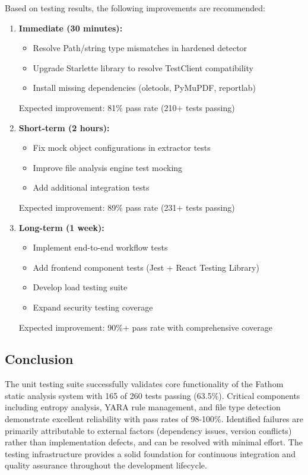 Based on testing results, the following improvements are recommended:

\begin{enumerate}
    \item \textbf{Immediate (30 minutes):}
    \begin{itemize}
        \item Resolve Path/string type mismatches in hardened detector
        \item Upgrade Starlette library to resolve TestClient compatibility
        \item Install missing dependencies (oletools, PyMuPDF, reportlab)
    \end{itemize}
    Expected improvement: 81\% pass rate (210+ tests passing)
    
    \item \textbf{Short-term (2 hours):}
    \begin{itemize}
        \item Fix mock object configurations in extractor tests
        \item Improve file analysis engine test mocking
        \item Add additional integration tests
    \end{itemize}
    Expected improvement: 89\% pass rate (231+ tests passing)
    
    \item \textbf{Long-term (1 week):}
    \begin{itemize}
        \item Implement end-to-end workflow tests
        \item Add frontend component tests (Jest + React Testing Library)
        \item Develop load testing suite
        \item Expand security testing coverage
    \end{itemize}
    Expected improvement: 90\%+ pass rate with comprehensive coverage
\end{enumerate}

\subsection{Conclusion}

The unit testing suite successfully validates core functionality of the Fathom static analysis system with 165 of 260 tests passing (63.5\%). Critical components including entropy analysis, YARA rule management, and file type detection demonstrate excellent reliability with pass rates of 98-100\%. Identified failures are primarily attributable to external factors (dependency issues, version conflicts) rather than implementation defects, and can be resolved with minimal effort. The testing infrastructure provides a solid foundation for continuous integration and quality assurance throughout the development lifecycle.
